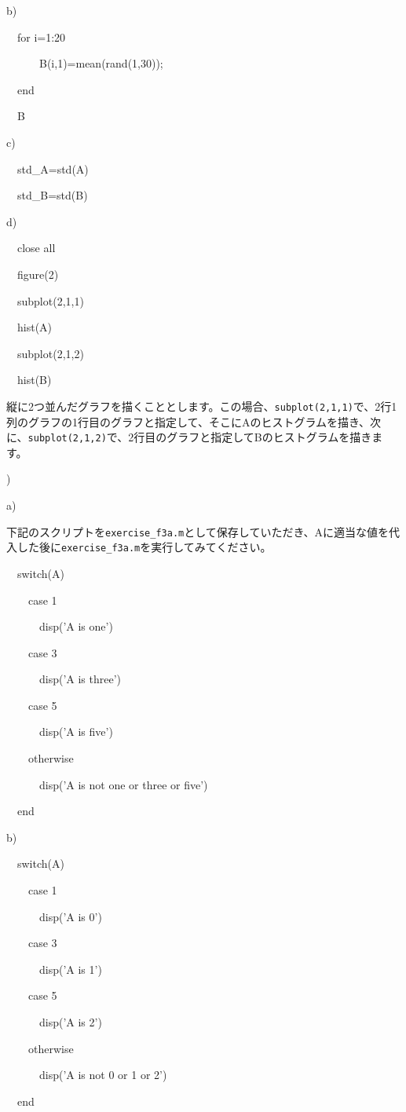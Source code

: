 \documentclass{jsarticle}
\begin{document}
\bigskip

b) {\tt 

\ \ for i=1:20

\ \ \ \ \ \ B(i,1)=mean(rand(1,30));

\ \ end

\ \ B
}

\bigskip

c) {\tt

\ \ std\_A=std(A)

\ \ std\_B=std(B)
}

\bigskip

d) {\tt

\ \ close all

\ \ figure(2)

\ \ subplot(2,1,1)

\ \ hist(A)

\ \ subplot(2,1,2)

\ \ hist(B)
}

\begin{screen}
縦に2つ並んだグラフを描くこととします。この場合、{\tt subplot(2,1,1)}で、2行1列のグラフの1行目のグラフと指定して、そこにAのヒストグラムを描き、次に、{\tt subplot(2,1,2)}で、2行目のグラフと指定してBのヒストグラムを描きます。
\end{screen}

\bigskip


)

a)

\begin{screen}
下記のスクリプトを{\tt exercise\_f3a.m}として保存していただき、Aに適当な値を代入した後に{\tt exercise\_f3a.m}を実行してみてください。
\end{screen}

{\tt

\ \ switch(A)

\ \ \ \ case 1

\ \ \ \ \ \ disp('A is one')

\ \ \ \ case 3

\ \ \ \ \ \ disp('A is three')

\ \ \ \ case 5

\ \ \ \ \ \ disp('A is five')

\ \ \ \ otherwise

\ \ \ \ \ \ disp('A is not one or three or five')

\ \ end
}

\bigskip

b)

{\tt

\ \ switch(A)

\ \ \ \ case 1

\ \ \ \ \ \ disp('A is 0')

\ \ \ \ case 3

\ \ \ \ \ \ disp('A is 1')

\ \ \ \ case 5

\ \ \ \ \ \ disp('A is 2')

\ \ \ \ otherwise

\ \ \ \ \ \ disp('A is not 0 or 1 or 2')

\ \ end
}
\end{document}
